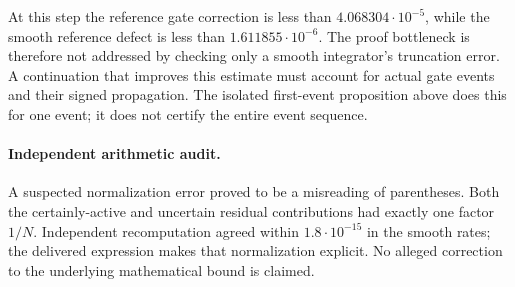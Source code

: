 At this step the reference gate correction is less than
$4.068304\cdot10^{-5}$, while the smooth reference defect is less than
$1.611855\cdot10^{-6}$. The proof bottleneck is therefore not addressed
by checking only a smooth integrator's truncation error. A continuation
that improves this estimate must account for actual gate events and their
signed propagation. The isolated first-event proposition above does this
for one event; it does not certify the entire event sequence.

\paragraph{Independent arithmetic audit.}
A suspected normalization error proved to be a misreading of parentheses.
Both the certainly-active and uncertain residual contributions had exactly
one factor $1/N$. Independent recomputation agreed within
$1.8\cdot10^{-15}$ in the smooth rates; the delivered expression makes
that normalization explicit. No alleged correction to the underlying
mathematical bound is claimed.
